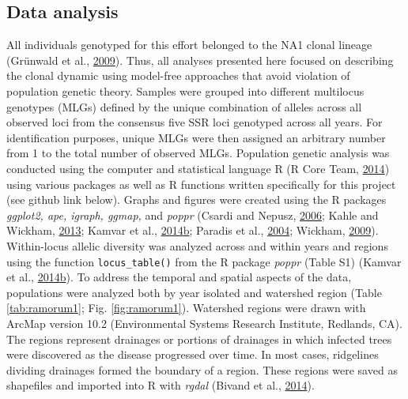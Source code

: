 \documentclass[double,12pt]{beavtex}
\begin{document}
  \subsection{Data analysis}\label{data-analysis}
  
  All individuals genotyped for this effort belonged to the NA1 clonal
  lineage (Grünwald et al.,
  \protect\hyperlink{ref-grunwald2009standardizing}{2009}). Thus, all
  analyses presented here focused on describing the clonal dynamic using
  model-free approaches that avoid violation of population genetic theory.
  Samples were grouped into different multilocus genotypes (MLGs) defined
  by the unique combination of alleles across all observed loci from the
  consensus five SSR loci genotyped across all years. For identification
  purposes, unique MLGs were then assigned an arbitrary number from 1 to
  the total number of observed MLGs. Population genetic analysis was
  conducted using the computer and statistical language R (R Core Team,
  \protect\hyperlink{ref-R2014}{2014}) using various packages as well as R
  functions written specifically for this project (see github link below).
  Graphs and figures were created using the R packages \emph{ggplot2, ape,
  igraph, ggmap,} and \emph{poppr} (Csardi and Nepusz,
  \protect\hyperlink{ref-csardi2006igraph}{2006}; Kahle and Wickham,
  \protect\hyperlink{ref-khale2013ggmap}{2013}; Kamvar et al.,
  \protect\hyperlink{ref-kamvar2014poppr}{2014}\protect\hyperlink{ref-kamvar2014poppr}{b};
  Paradis et al., \protect\hyperlink{ref-paradis2004ape}{2004}; Wickham,
  \protect\hyperlink{ref-wickham2009ggplot2}{2009}). Within-locus allelic
  diversity was analyzed across and within years and regions using the
  function \texttt{locus\_table()} from the R package \emph{poppr} (Table
  S1) (Kamvar et al.,
  \protect\hyperlink{ref-kamvar2014poppr}{2014}\protect\hyperlink{ref-kamvar2014poppr}{b}).
  To address the temporal and spatial aspects of the data, populations
  were analyzed both by year isolated and watershed region (Table
  \ref{tab:ramorum1}; Fig. \ref{fig:ramorum1}). Watershed regions were
  drawn with ArcMap version 10.2 (Environmental Systems Research
  Institute, Redlands, CA). The regions represent drainages or portions of
  drainages in which infected trees were discovered as the disease
  progressed over time. In most cases, ridgelines dividing drainages
  formed the boundary of a region. These regions were saved as shapefiles
  and imported into R with \emph{rgdal} (Bivand et al.,
  \protect\hyperlink{ref-bivand2014rgdal}{2014}).
  
\end{document}
